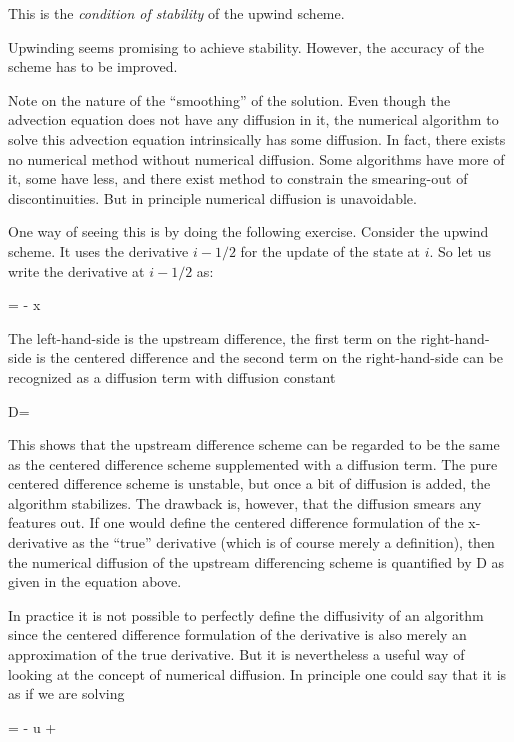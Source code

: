This is the {\it condition of stability} of the upwind scheme.

Upwinding seems promising to achieve stability. However, the accuracy
of the scheme has to be improved.

Note on the nature of the ``smoothing'' of the solution. Even though
the advection equation does not have any diffusion in it, the
numerical algorithm to solve this advection equation intrinsically has
some diffusion. In fact, there exists no numerical method without
numerical diffusion. Some algorithms have more of it, some have less,
and there exist method to constrain the smearing-out of
discontinuities. But in principle numerical diffusion is
unavoidable.

One way of seeing this is by doing the following exercise. Consider the upwind scheme. It
uses the derivative $i- 1/2$ for the update of the state at $i$. So let us write the derivative at $i- 1/2$ as:

\beq
{} =  -
\Delta x 
\eeq

The left-hand-side is the upstream difference, the first term on the
right-hand-side is the centered difference and the second term on the
right-hand-side can be recognized as a diffusion term with diffusion constant

\beq
D=
\eeq

This shows that the upstream difference scheme can be regarded to be the same as the centered
difference scheme supplemented with a diffusion term. The pure centered difference scheme
is unstable, but once a bit of diffusion is added, the algorithm stabilizes. The drawback is,
however, that the diffusion smears any features out. If one would define the centered difference
formulation of the x-derivative as the ``true'' derivative (which is of course merely a definition),
then the numerical diffusion of the upstream differencing scheme is
quantified by D as given in the equation above. 

In practice it is not possible to perfectly define the diffusivity of an algorithm since the
centered difference formulation of the derivative is also merely an approximation of the true
derivative. But it is nevertheless a useful way of looking at the concept of numerical diffusion.
In principle one could say that it is as if we are solving

\beq
{} = - u  +
\eeq

